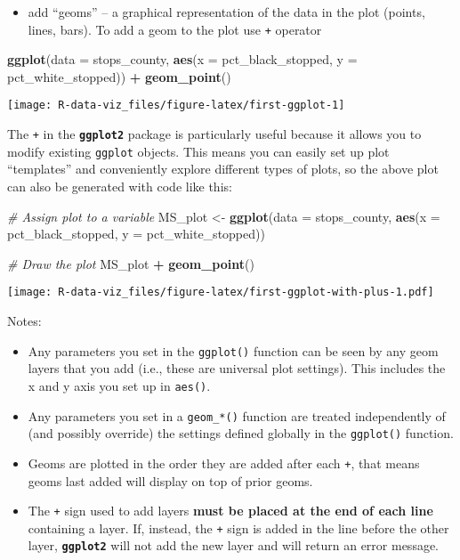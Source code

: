 \documentclass[]{book}
\newenvironment{Shaded}{\begin{snugshade}}{\end{snugshade}}
\newcommand{\CommentTok}[1]{\textcolor[rgb]{0.56,0.35,0.01}{\textit{#1}}}
\newcommand{\DataTypeTok}[1]{\textcolor[rgb]{0.13,0.29,0.53}{#1}}
\newcommand{\KeywordTok}[1]{\textcolor[rgb]{0.13,0.29,0.53}{\textbf{#1}}}
\newcommand{\NormalTok}[1]{#1}
\newcommand{\OperatorTok}[1]{\textcolor[rgb]{0.81,0.36,0.00}{\textbf{#1}}}
\newcommand{\StringTok}[1]{\textcolor[rgb]{0.31,0.60,0.02}{#1}}
\providecommand{\tightlist}{%
  \setlength{\itemsep}{0pt}\setlength{\parskip}{0pt}}
\begin{document}
\begin{itemize}
\tightlist
\item
  add ``geoms'' -- a graphical representation of the data in the plot (points, lines, bars). To add a geom to the plot use \texttt{+} operator
\end{itemize}

\begin{Shaded}
\begin{Highlighting}[]
\KeywordTok{ggplot}\NormalTok{(}\DataTypeTok{data =}\NormalTok{ stops_county, }\KeywordTok{aes}\NormalTok{(}\DataTypeTok{x =}\NormalTok{ pct_black_stopped, }\DataTypeTok{y =}\NormalTok{ pct_white_stopped)) }\OperatorTok{+}
\StringTok{  }\KeywordTok{geom_point}\NormalTok{()}
\end{Highlighting}
\end{Shaded}

\texttt{[image: R-data-viz\_files/figure-latex/first-ggplot-1]}

The \texttt{+} in the \textbf{\texttt{ggplot2}} package is particularly useful because it allows you
to modify existing \texttt{ggplot} objects. This means you can easily set up plot
``templates'' and conveniently explore different types of plots, so the above
plot can also be generated with code like this:

\begin{Shaded}
\begin{Highlighting}[]
\CommentTok{# Assign plot to a variable}
\NormalTok{MS_plot <-}\StringTok{ }\KeywordTok{ggplot}\NormalTok{(}\DataTypeTok{data =}\NormalTok{ stops_county, }\KeywordTok{aes}\NormalTok{(}\DataTypeTok{x =}\NormalTok{ pct_black_stopped, }\DataTypeTok{y =}\NormalTok{ pct_white_stopped))}

\CommentTok{# Draw the plot}
\NormalTok{MS_plot }\OperatorTok{+}\StringTok{ }\KeywordTok{geom_point}\NormalTok{()}
\end{Highlighting}
\end{Shaded}

\texttt{[image: R-data-viz\_files/figure-latex/first-ggplot-with-plus-1.pdf]}

Notes:

\begin{itemize}
\tightlist
\item
  Any parameters you set in the \texttt{ggplot()} function can be seen by any geom layers
  that you add (i.e., these are universal plot settings). This includes the x and y axis you set up in \texttt{aes()}.
\item
  Any parameters you set in a \texttt{geom\_*()} function are treated independently of (and possibly override) the settings defined globally in the \texttt{ggplot()} function.
\item
  Geoms are plotted in the order they are added after each \texttt{+}, that means geoms last added will display on top of prior geoms.
\item
  The \texttt{+} sign used to add layers \textbf{must be placed at the end of each line} containing
  a layer. If, instead, the \texttt{+} sign is added in the line before the other layer,
  \textbf{\texttt{ggplot2}} will not add the new layer and will return an error message.
\end{itemize}
\end{document}
